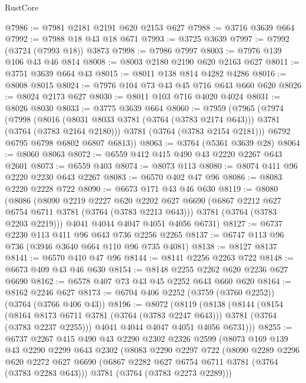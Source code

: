 \begin{lexlean}{RustCore}
\begin{coremodule}
@7986 := @7981 @2181 @2191 @620 @2153 @627
@7988 := @3716 @3639 @664
@7992 := @7988 @18 @43 @18 @671
@7993 := @3725 @3639
@7997 := @7992 (@3724 (@7993 @18)) @3873
@7998 := @7986 @7997
@8003 := @7976 @139 @106 @43 @46 @814
@8008 := @8003 @2180 @2190 @620 @2163 @627
@8011 := @3751 @3639 @664 @43
@8015 := @8011 @138 @814 @4282 @4286
@8016 := @8008 @8015
@8024 := @7976 @104 @73 @43 @45 @716 @643 @660 @620
@8026 := @8024 @2173 @627
@8030 := @8011 @103 @716 @4020 @4024
@8031 := @8026 @8030
@8033 := @3775 @3639 @664
@8060 := @7959
    (@7965
      (@7974
        (@7998
          (@8016 (@8031 @8033 @3781 (@3764 (@3783 @2174 @643))) @3781 (@3764 (@3783 @2164 @2180)))
          @3781
          (@3764 (@3783 @2154 @2181)))
        @6792
        @6795
        @6798
        @6802
        @6807
        @6813))
@8063 := @3764 (@5361 @3639 @28)
@8064 := @8060 @8063
@8072 := @6559 @412 @415 @490 @43 @2220 @2267 @643 @2601
@8073 := @6559 @403
@8074 := @8073 @113
@8080 := @8074 @411 @96 @2220 @2230 @643 @2267
@8083 := @6570 @402 @47 @96
@8086 := @8083 @2220 @2228 @722
@8090 := @6673 @171 @43 @46 @630
@8119 := @8080
    (@8086
      (@8090
        @2219
        @2227
        @620
        @2202
        @627
        @6690
        (@6867 @2212 @627 @6754 @6711 @3781 (@3764 (@3783 @2213 @643)))
        @3781
        (@3764 (@3783 @2203 @2219)))
      @4041
      @4044
      @4047
      @4051
      @4056
      @6731)
@8127 := @6737 @2230 @113 @411 @96 @643 @736 @2256 @2265
@8137 := @6747 @113 @96 @736 (@3946 @3640 @664 @110 @96 @735 @4081)
@8138 := @8127 @8137
@8141 := @6570 @410 @47 @96
@8144 := @8141 @2256 @2263 @722
@8148 := @6673 @409 @43 @46 @630
@8154 := @8148 @2255 @2262 @620 @2236 @627 @6690
@8162 := @6578 @407 @73 @43 @45 @2252 @643 @660 @620
@8164 := @8162 @2246 @627
@8173 := @6704 @406 @2252 (@3759 (@3760 @2252)) (@3764 (@3766 @406 @43))
@8196 := @8072
    (@8119
      (@8138
        (@8144
          (@8154
            (@8164 @8173 @6711 @3781 (@3764 (@3783 @2247 @643)))
            @3781
            (@3764 (@3783 @2237 @2255)))
          @4041
          @4044
          @4047
          @4051
          @4056
          @6731)))
@8255 := @6737
    @2267
    @415
    @490
    @43
    @2290
    @2302
    @2326
    @2599
    (@8073
      @169
      @139
      @43
      @2290
      @2299
      @643
      @2302
      (@8083
        @2290
        @2297
        @722
        (@8090
          @2289
          @2296
          @620
          @2272
          @627
          @6690
          (@6867 @2282 @627 @6754 @6711 @3781 (@3764 (@3783 @2283 @643)))
          @3781
          (@3764 (@3783 @2273 @2289)))

\end{coremodule}
\end{lexlean}
